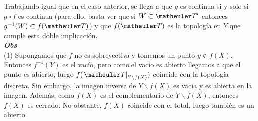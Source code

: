 Trabajando igual que en el caso anterior, se llega a que $g$ es continua si y solo si $g\circ f$ es continua (para ello, basta ver que si $W\subset \T'$ entonces $g^{-1}(W)\subset f(\T)$) y que $f(\T)$ es la topología en $Y$ que cumple esta doble implicación. \\

\textbf{\textit{Obs}}\\

(1) Supongamos que $f$ no es sobreyectiva y tomemos un punto $y\notin f(X)$. Entonces $f^{-1}(Y)$ es el vacío, pero como el vacío es abierto llegamos a que el punto es abierto, luego $f(\left.\T\right|_{Y\backslash f(X)})$ coincide con la topología discreta. Sin embargo, la imagen inversa de $Y\backslash f(X)$ es vacía y es abierta en la imagen. Además, como $f(X)$ es el complementario de $Y\backslash f(X)$, entonces $f(X)$ es cerrado. No obstante, $f(X)$ coincide con el total, luego también es un abierto. 
